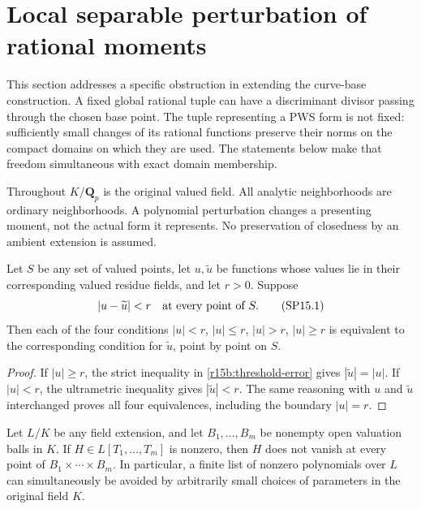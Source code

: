 \section{Local separable perturbation of rational moments}
\label{r15b:local-perturbation-section}

This section addresses a specific obstruction in extending the
curve-base construction. A fixed global rational tuple can have a
discriminant divisor passing through the chosen base point. The
tuple representing a PWS form is not fixed: sufficiently small
changes of its rational functions preserve their norms on the
compact domains on which they are used. The statements below make
that freedom simultaneous with exact domain membership.

Throughout $K/\mathbf Q_p$ is the original valued field. All
analytic neighborhoods are ordinary neighborhoods. A polynomial
perturbation changes a presenting moment, not the actual form it
represents. No preservation of closedness by an ambient extension
is assumed.

\begin{lemma}
\label{r15b:threshold-stability}
Let $S$ be any set of valued points, let $u,\widetilde u$ be
functions whose values lie in their corresponding valued residue
fields, and let $r>0$. Suppose
\[
                 |u-\widetilde u|<r\quad\hbox{at every point of }S.
\tag{SP15.1}\label{r15b:threshold-error}
\]
Then each of the four conditions
$|u|<r$, $|u|\leq r$, $|u|>r$, $|u|\geq r$ is equivalent
to the corresponding condition for $\widetilde u$, point by point
on $S$.
\end{lemma}

\begin{proof}
If $|u|\geq r$, the strict inequality in
\eqref{r15b:threshold-error} gives
$|\widetilde u|=|u|$. If $|u|<r$, the ultrametric inequality
gives $|\widetilde u|<r$. The same reasoning with $u$ and
$\widetilde u$ interchanged proves all four equivalences,
including the boundary $|u|=r$.
\end{proof}

\begin{lemma}
\label{r15b:small-ball-density}
Let $L/K$ be any field extension, and let $B_1,\ldots,B_m$ be
nonempty open valuation balls in $K$. If
$H\in L[T_1,\ldots,T_m]$ is nonzero, then $H$ does not vanish
at every point of $B_1\times\cdots\times B_m$.
In particular, a finite list of nonzero polynomials over $L$
can simultaneously be avoided by arbitrarily small choices of
parameters in the original field $K$.
\end{lemma}

